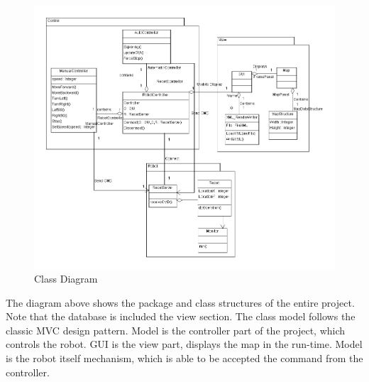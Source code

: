 \documentclass[11pt, a4paper]{report}
\begin{document}
\begin{figure}[h]
  \centering
    \includegraphics[width=16cm]{SEP_13_Class_Diagram.png}
  \caption{Class Diagram}
\end{figure}
The diagram above shows the package and class structures of the entire project. Note that the database
is included the view section. The class model follows the classic MVC design pattern. Model is the controller part of the project, which controls the robot. GUI is the view part, displays the map in the run-time. Model is the robot itself mechanism, which is able to be accepted the command from the controller.
\newpage
\end{document}
